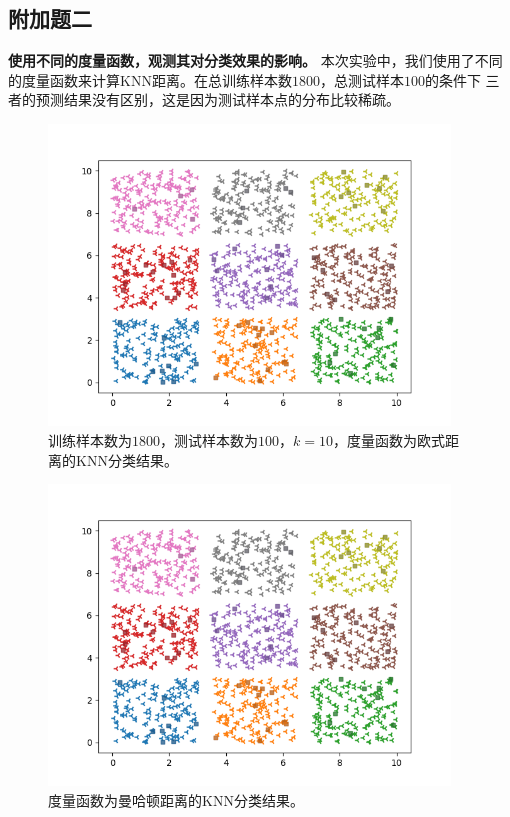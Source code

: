 \documentclass{article}
\begin{document}
\subsection*{\Large 附加题二}
{\large\textbf{使用不同的度量函数，观测其对分类效果的影响。}}
本次实验中，我们使用了不同的度量函数来计算KNN距离。在总训练样本数$1800$，总测试样本$100$的条件下
三者的预测结果没有区别，这是因为测试样本点的分布比较稀疏。
\begin{figure}[H]
    \centering
    \begin{minipage}[t]{1.0\linewidth}
        \centering
        \includegraphics[height=8cm]{eu1.png}
        \caption{训练样本数为$1800$，测试样本数为$100$，$k=10$，度量函数为欧式距离的KNN分类结果。}
    \end{minipage}
 \end{figure}
 \begin{figure}[H]
    \centering
    \begin{minipage}[t]{1.0\linewidth}
        \centering
        \includegraphics[height=8cm]{man1.png}
        \caption{度量函数为曼哈顿距离的KNN分类结果。}
    \end{minipage}
 \end{figure}
\end{document}

